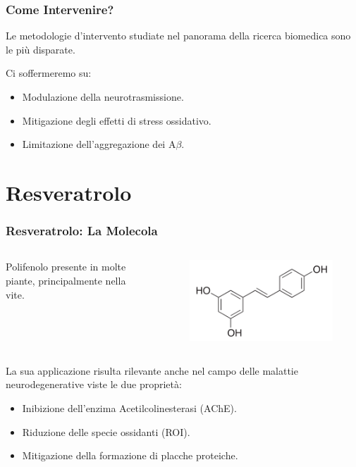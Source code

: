 \documentclass[9pt]{beamer}
\begin{document}
\begin{frame}
	\frametitle{Come Intervenire?}
	Le metodologie d'intervento studiate nel panorama della ricerca biomedica sono le più disparate.
	
	Ci soffermeremo su:
	\begin{itemize}
		\item Modulazione della neurotrasmissione.
		\item Mitigazione degli effetti di stress ossidativo.
		\item Limitazione dell'aggregazione dei A$\beta$.
	\end{itemize}
	
	
	
\end{frame}
\section{Resveratrolo}

\begin{frame}
	\frametitle{Resveratrolo: La Molecola}
	\begin{columns}
		\begin{column}{0.5\textwidth}
			Polifenolo presente in molte piante, principalmente nella vite.
		\end{column}
		\begin{column}{0.5\textwidth}
			\begin{figure}
				\includegraphics[width=.8\textwidth]{immagini/resveratrolo.png}
			\end{figure}
		\end{column}
	\end{columns}
	\medskip
	La sua applicazione risulta rilevante anche nel campo delle malattie neurodegenerative viste le due proprietà:
	\begin{itemize}
		\item Inibizione dell'enzima Acetilcolinesterasi (AChE).
		\item Riduzione delle specie ossidanti (ROI).
		\item Mitigazione della formazione di placche proteiche.
	\end{itemize}
\end{frame}
\end{document}
